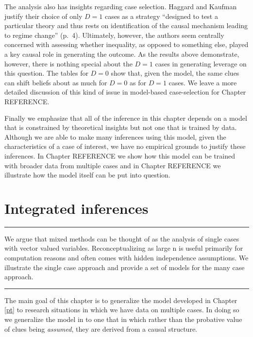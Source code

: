 \documentclass[
  12pt,
]{book}
\begin{document}
The analysis also has insights regarding case selection. Haggard and Kaufman justify their choice of only \(D=1\) cases as a strategy ``designed to test a particular theory and thus rests on identification of the causal mechanism leading to regime change'' (p.~4). Ultimately, however, the authors seem centrally concerned with assessing whether inequality, as opposed to something else, played a key causal role in generating the outcome. As the results above demonstrate, however, there is nothing special about the \(D=1\) cases in generating leverage on this question. The tables for \(D=0\) show that, given the model, the same clues can shift beliefs about as much for \(D=0\) as for \(D=1\) cases. We leave a more detailed discussion of this kind of issue in model-based case-selection for Chapter REFERENCE.

Finally we emphasize that all of the inference in this chapter depends on a model that is constrained by theoretical insights but not one that is trained by data. Although we are able to make many inferences using this model, given the characteristics of a case of interest, we have no empirical grounds to justify these inferences. In Chapter REFERENCE we show how this model can be trained with broader data from multiple cases and in Chapter REFERENCE we illustrate how the model itself can be put into question.

\hypertarget{mixing}{%
\chapter{Integrated inferences}\label{mixing}}

\begin{center}\rule{0.5\linewidth}{0.5pt}\end{center}

We argue that mixed methods can be thought of as the analysis of single cases with vector valued variables. Reconceptualizing as large n is useful primarily for computation reasons and often comes with hidden independence assumptions. We illustrate the single case approach and provide a set of models for the many case approach.

\begin{center}\rule{0.5\linewidth}{0.5pt}\end{center}

The main goal of this chapter is to generalize the model developed in Chapter \ref{pt} to research situations in which we have data on multiple cases. In doing so we generalize the model in \citet{humphreys2015mixing} to one that in which rather than the probative value of clues being \emph{assumed}, they are derived from a causal structure.
\end{document}
